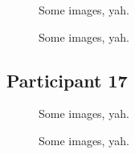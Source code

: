 \begin{figure}[h]
	\caption{Some images, yah.}
\end{figure}

\lipsum[1]

\clearpage

\begin{figure}[h]
	\caption{Some images, yah.}
\end{figure}

\lipsum[1]


\clearpage

\subsection{Participant 17}

\begin{figure}[h]
	\caption{Some images, yah.}
\end{figure}

\lipsum[1]

\clearpage

\begin{figure}[h]
	\caption{Some images, yah.}
\end{figure}

\lipsum[1]

